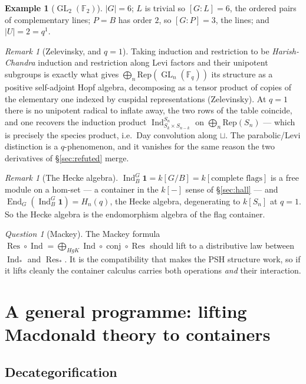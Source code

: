 \documentclass[11pt,a4paper]{article}
\theoremstyle{definition}
\newtheorem{example}[theorem]{Example}
\theoremstyle{remark}
\newtheorem{remark}[theorem]{Remark}
\newtheorem{question}[theorem]{Question}
\newcommand{\FF}{\mathbb{F}}
\newcommand{\Rep}{\mathrm{Rep}}
\DeclareMathOperator{\GL}{GL}
\DeclareMathOperator{\End}{End}
\DeclareMathOperator{\Ind}{Ind}
\DeclareMathOperator{\Res}{Res}
\begin{document}
\begin{example}[$\GL_2(\FF_2)$]
$\lvert G\rvert = 6$; $L$ is trivial so $[G:L] = 6$, the ordered pairs of
complementary lines; $P = B$ has order $2$, so $[G:P] = 3$, the lines; and
$\lvert U\rvert = 2 = q^{1}$.
\end{example}

\begin{remark}[Zelevinsky, and $q = 1$]
Taking induction and restriction to be \emph{Harish-Chandra} induction and
restriction along Levi factors and their unipotent subgroups is exactly what gives
$\bigoplus_n \Rep(\GL_n(\FF_q))$ its structure as a positive self-adjoint Hopf
algebra, decomposing as a tensor product of copies of the elementary one indexed by
cuspidal representations (Zelevinsky). At $q = 1$ there is no unipotent radical to
inflate away, the two rows of the table coincide, and one recovers the induction
product $\Ind_{S_k \times S_{n-k}}^{S_n}$ on $\bigoplus_n \Rep(S_n)$ --- which is
precisely the species product, i.e.\ Day convolution along $\sqcup$. The
parabolic/Levi distinction is a $q$-phenomenon, and it vanishes for the same reason
the two derivatives of \S\ref{sec:refuted} merge.
\end{remark}

\begin{remark}[The Hecke algebra]
$\Ind_B^G \mathbf{1} = k[G/B] = k[\text{complete flags}]$ is a free module on a
hom-set --- a container in the $k[-]$ sense of \S\ref{sec:hall} --- and
$\End_G(\Ind_B^G \mathbf{1}) = H_n(q)$, the Hecke algebra, degenerating to $k[S_n]$
at $q = 1$. So the Hecke algebra is the endomorphism algebra of the flag container.
\end{remark}

\begin{question}[Mackey]\label{q:mackey}
The Mackey formula $\Res \circ \Ind = \bigoplus_{HgK} \Ind \circ \operatorname{conj}
\circ \Res$ should lift to a distributive law between $\Ind_{*}$ and $\Res_{*}$. It
is the compatibility that makes the PSH structure work, so if it lifts cleanly the
container calculus carries both operations \emph{and} their interaction.
\end{question}


\section{A general programme: lifting Macdonald theory to containers}\label{sec:programme}

\subsection{Decategorification}
\end{document}
